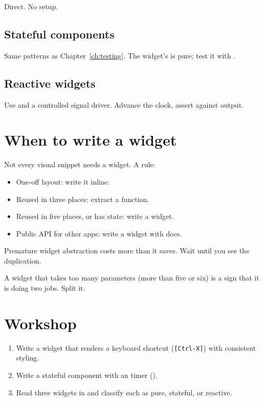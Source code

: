 Direct. No setup.

\subsection*{Stateful components}

Same patterns as Chapter~\ref{ch:testing}. The widget's
 is pure; test it with .

\subsection*{Reactive widgets}

Use  and a controlled signal driver.
Advance the clock, assert against  output.

\section{When to write a widget}

Not every visual snippet needs a widget. A rule:

\begin{itemize}[leftmargin=*]
  \item One-off layout: write it inline.
  \item Reused in three places: extract a function.
  \item Reused in five places, or has state: write a widget.
  \item Public API for other apps: write a widget with docs.
\end{itemize}

Premature widget abstraction costs more than it saves. Wait
until you see the duplication.

\begin{warning}
A widget that takes too many parameters (more than five or
six) is a sign that it is doing two jobs. Split it.
\end{warning}

\section*{Workshop}

\begin{enumerate}[leftmargin=*]
  \item Write a  widget that renders a keyboard
    shortcut (\verb|[Ctrl-X]|) with consistent styling.
  \item Write a  stateful component with an
     timer ().
  \item Read three widgets in 
    and classify each as pure, stateful, or reactive.
\end{enumerate}

